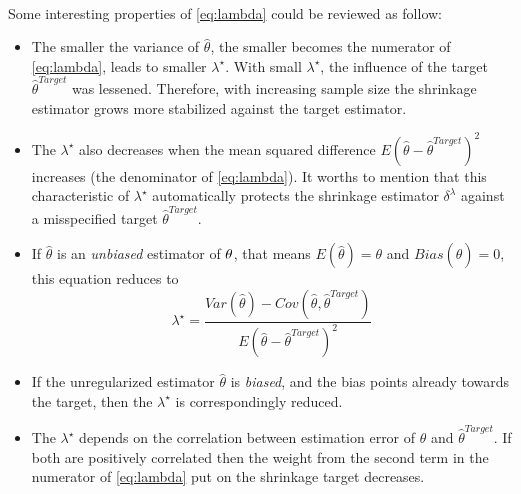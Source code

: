 \\
Some interesting properties of \autoref{eq:lambda} could be reviewed as follow:
\begin{itemize} 
	\item The smaller the variance of $\hat \theta$, the smaller becomes the numerator of \autoref{eq:lambda}, leads to smaller $\lambda^\star$. With small $\lambda^\star$, the influence of the target $\hat \theta^{Target}$ was lessened. Therefore, with increasing sample size the shrinkage estimator grows more stabilized against the target estimator.
	\item The $\lambda^\star$ also decreases when the mean squared difference $E(\hat \theta - {\hat \theta}^{Target})^2$ increases (the denominator of \autoref{eq:lambda}). It worths to mention that this characteristic of $\lambda^\star$ automatically protects the shrinkage estimator $\delta^{\lambda}$ against a misspecified target ${\hat \theta}^{Target}$.
	\item If $\hat \theta$ is an {\it unbiased} estimator of ${\bf \theta}$, that means $E(\hat \theta) = \theta$ and $Bias(\hat \theta) = 0$, this equation reduces to
		\begin{equation}
			\lambda^\star = \frac{Var(\hat \theta) - Cov(\hat \theta, \hat \theta^{Target})}{E(\hat \theta - {\hat \theta}^{Target})^2}
		\end{equation}	
	\item If the unregularized estimator $\hat \theta$ is {\it biased}, and the bias points already towards the target, then the $\lambda^\star$ is correspondingly reduced.	
	\item The $\lambda^\star$ depends on the correlation between estimation error of $\hat \theta$ and $\hat \theta^{Target}$. If both are positively correlated then the weight from the second term in the numerator of \autoref{eq:lambda} put on the shrinkage target decreases.
\end{itemize}
